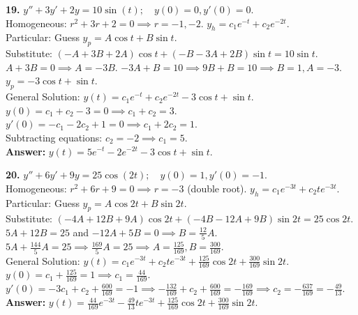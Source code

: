\documentclass[11pt]{article}
\begin{document}
\vspace{0.5cm}
\textbf{19.} $y'' + 3y' + 2y = 10 \sin(t); \quad y(0) = 0, y'(0) = 0$. \\
Homogeneous: $r^2 + 3r + 2 = 0 \implies r = -1, -2$. $y_h = c_1 e^{-t} + c_2 e^{-2t}$. \\
Particular: Guess $y_p = A \cos t + B \sin t$. \\
Substitute: $(-A + 3B + 2A)\cos t + (-B - 3A + 2B)\sin t = 10 \sin t$. \\
$A + 3B = 0 \implies A = -3B$. $-3A + B = 10 \implies 9B + B = 10 \implies B = 1, A = -3$. \\
$y_p = -3 \cos t + \sin t$. \\
General Solution: $y(t) = c_1 e^{-t} + c_2 e^{-2t} - 3 \cos t + \sin t$. \\
$y(0) = c_1 + c_2 - 3 = 0 \implies c_1 + c_2 = 3$. \\
$y'(0) = -c_1 - 2c_2 + 1 = 0 \implies c_1 + 2c_2 = 1$. \\
Subtracting equations: $c_2 = -2 \implies c_1 = 5$. \\
\textbf{Answer:} $y(t) = 5e^{-t} - 2e^{-2t} - 3 \cos t + \sin t$.

\vspace{0.5cm}
\textbf{20.} $y'' + 6y' + 9y = 25 \cos(2t); \quad y(0) = 1, y'(0) = -1$. \\
Homogeneous: $r^2 + 6r + 9 = 0 \implies r = -3$ (double root). $y_h = c_1 e^{-3t} + c_2 t e^{-3t}$. \\
Particular: Guess $y_p = A \cos 2t + B \sin 2t$. \\
Substitute: $(-4A + 12B + 9A)\cos 2t + (-4B - 12A + 9B)\sin 2t = 25 \cos 2t$. \\
$5A + 12B = 25$ and $-12A + 5B = 0 \implies B = \frac{12}{5}A$. \\
$5A + \frac{144}{5}A = 25 \implies \frac{169}{5}A = 25 \implies A = \frac{125}{169}, B = \frac{300}{169}$. \\
General Solution: $y(t) = c_1 e^{-3t} + c_2 t e^{-3t} + \frac{125}{169} \cos 2t + \frac{300}{169} \sin 2t$. \\
$y(0) = c_1 + \frac{125}{169} = 1 \implies c_1 = \frac{44}{169}$. \\
$y'(0) = -3c_1 + c_2 + \frac{600}{169} = -1 \implies -\frac{132}{169} + c_2 + \frac{600}{169} = -\frac{169}{169} \implies c_2 = -\frac{637}{169} = -\frac{49}{13}$. \\
\textbf{Answer:} $y(t) = \frac{44}{169} e^{-3t} - \frac{49}{13} t e^{-3t} + \frac{125}{169} \cos 2t + \frac{300}{169} \sin 2t$.
\end{document}
